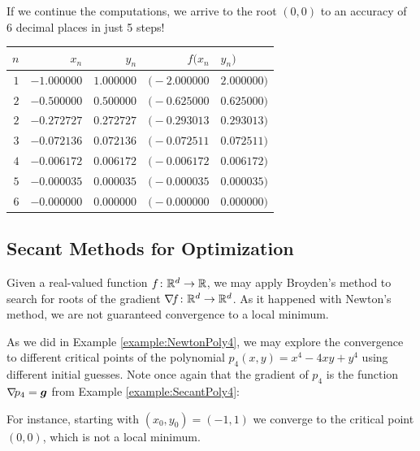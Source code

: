 \begin{example}
If we continue the computations, we arrive to the root $(0,0)$ to an accuracy of 6 decimal places in just 5 steps!
\begin{center}
\begin{tabular}{|r|r|r|r@{, }l|} \hline 
$n$ & $x_n$ & $y_n$ & $f(x_n$ & $y_n)$ \\ \hline \hline 
$1$ & $-1.000000$ & $1.000000$ & $\big(-2.000000$ & $2.000000 \big)$ \\ \hline 
$2$ & $-0.500000$ & $0.500000$ & $\big(-0.625000$ & $0.625000 \big)$ \\ \hline 
$2$ & $-0.272727$ & $0.272727$ & $\big(-0.293013$ & $0.293013 \big)$ \\ \hline 
$3$ & $-0.072136$ & $0.072136$ & $\big(-0.072511$ & $0.072511 \big)$ \\ \hline 
$4$ & $-0.006172$ & $0.006172$ & $\big(-0.006172$ & $0.006172 \big)$ \\ \hline 
$5$ & $-0.000035$ & $0.000035$ & $\big(-0.000035$ & $0.000035 \big)$ \\ \hline 
$6$ & $-0.000000$ & $0.000000$ & $\big(-0.000000$ & $0.000000 \big)$ \\ \hline 
\end{tabular}
\end{center}
\end{example}

\subsection{Secant Methods for Optimization}

Given a real-valued function $f \colon \mathbb{R}^d \to \mathbb{R}$, we may apply Broyden's method to search for roots of the gradient $\mathop{\nabla\! {f}} \colon \mathbb{R}^d \to \mathbb{R}^d$.  As it happened with Newton's method, we are not guaranteed convergence to a local minimum.

\begin{example}
As we did in Example \ref{example:NewtonPoly4}, we may explore the convergence to different critical points of the polynomial $p_4(x,y) = x^4-4xy+y^4$ using different initial guesses.  Note once again that the gradient of $p_4$ is the function $\mathop{\nabla\! {p_4}} = \boldsymbol{g}$ from Example \ref{example:SecantPoly4}:

For instance, starting with $(x_0,y_0) = (-1,1)$ we converge to the critical point $(0,0)$, which is not a local minimum.
\end{example}